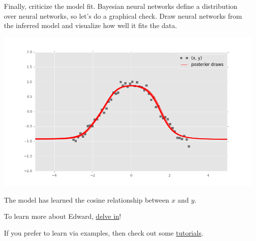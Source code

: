 Finally, criticize the model fit. Bayesian neural networks define a
distribution over neural networks, so let's do a graphical check. Draw
neural networks from the inferred model and visualize how well it
fits the data.

\includegraphics[width=700px]{images/getting-started-fig1.png}

The model has learned the cosine relationship between $x$ and $y$.

To learn more about Edward, \href{delving-in}{delve in}!

If you prefer to learn via examples, then check out some
\href{tutorials}{tutorials}.
